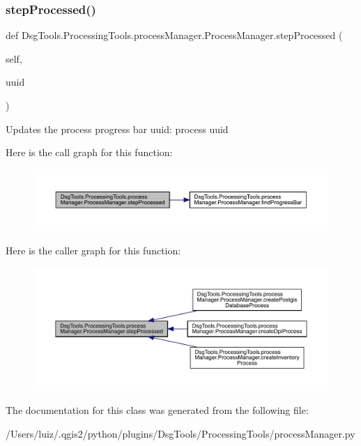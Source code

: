 \subsubsection{\texorpdfstring{step\+Processed()}{stepProcessed()}}
{\footnotesize\ttfamily def Dsg\+Tools.\+Processing\+Tools.\+process\+Manager.\+Process\+Manager.\+step\+Processed (\begin{DoxyParamCaption}\item[{}]{self,  }\item[{}]{uuid }\end{DoxyParamCaption})}

\begin{DoxyVerb}Updates the process progress bar
uuid: process uuid
\end{DoxyVerb}
 Here is the call graph for this function\+:
\nopagebreak
\begin{figure}[H]
\begin{center}
\leavevmode
\includegraphics[width=350pt]{class_dsg_tools_1_1_processing_tools_1_1process_manager_1_1_process_manager_a9b8eea4c358a48a612ac8f2d285708b4_cgraph}
\end{center}
\end{figure}
Here is the caller graph for this function\+:
\nopagebreak
\begin{figure}[H]
\begin{center}
\leavevmode
\includegraphics[width=350pt]{class_dsg_tools_1_1_processing_tools_1_1process_manager_1_1_process_manager_a9b8eea4c358a48a612ac8f2d285708b4_icgraph}
\end{center}
\end{figure}


The documentation for this class was generated from the following file\+:\begin{DoxyCompactItemize}
\item 
/\+Users/luiz/.\+qgis2/python/plugins/\+Dsg\+Tools/\+Processing\+Tools/process\+Manager.\+py\end{DoxyCompactItemize}
